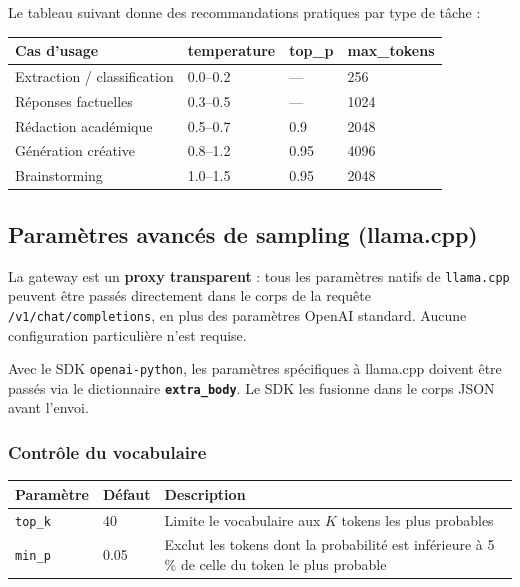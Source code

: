 \documentclass[12pt, a4paper, twoside]{article}
\newcommand{\api}[1]{\texttt{#1}}
\newcommand{\param}[1]{\texttt{\textbf{#1}}}
\begin{document}
Le tableau suivant donne des recommandations pratiques par type de tâche :

\begin{center}
\begin{tabular}{L{4cm} C{2.5cm} C{2cm} C{2.5cm}}
  \toprule
  \textbf{Cas d'usage} & \textbf{temperature} & \textbf{top\_p} & \textbf{max\_tokens} \\
  \midrule
  Extraction / classification  & 0.0--0.2 & ---  & 256  \\
  Réponses factuelles          & 0.3--0.5 & ---  & 1024 \\
  Rédaction académique         & 0.5--0.7 & 0.9  & 2048 \\
  Génération créative          & 0.8--1.2 & 0.95 & 4096 \\
  Brainstorming                & 1.0--1.5 & 0.95 & 2048 \\
  \bottomrule
\end{tabular}
\end{center}

\subsection{Paramètres avancés de sampling (llama.cpp)}
\label{sec:parametres-avances}

La gateway est un \textbf{proxy transparent} : tous les paramètres natifs de \texttt{llama.cpp}
peuvent être passés directement dans le corps de la requête \api{/v1/chat/completions}, en plus
des paramètres OpenAI standard. Aucune configuration particulière n'est requise.

Avec le SDK \texttt{openai-python}, les paramètres spécifiques à llama.cpp doivent être passés
via le dictionnaire \param{extra\_body}. Le SDK les fusionne dans le corps JSON avant l'envoi.

\subsubsection{Contrôle du vocabulaire}

\begin{center}
\begin{tabular}{L{2.5cm} C{1.5cm} L{9cm}}
  \toprule
  \textbf{Paramètre} & \textbf{Défaut} & \textbf{Description} \\
  \midrule
  \texttt{top\_k}  & 40   & Limite le vocabulaire aux $K$ tokens les plus probables \\
  \texttt{min\_p}  & 0.05 & Exclut les tokens dont la probabilité est inférieure à 5\,\%
                             de celle du token le plus probable \\
  \bottomrule
\end{tabular}
\end{center}
\end{document}
